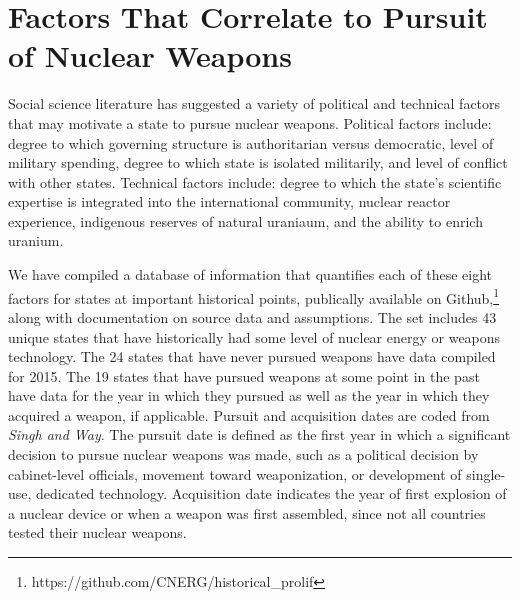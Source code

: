 \section{Factors That Correlate to Pursuit of Nuclear Weapons}
\label{s_factors}

Social science literature has suggested a variety of political and technical factors that may motivate a state to pursue nuclear weapons\cite{bell_questioning_2013, singh_correlates_2004, montgomery_perils_2009, li_model-based_2010, hymans_achieving_2012}. Political factors include: degree to which governing structure is authoritarian versus democratic, level of military spending, degree to which state is isolated militarily, and level of conflict with other states. Technical factors include: degree to which the state's scientific expertise is integrated into the international community, nuclear reactor experience, indigenous reserves of natural uraniaum, and the ability to enrich uranium.

We have compiled a database of information that quantifies each of these eight factors for states at important historical points, publically available on Github,\footnote{https://github.com/CNERG/historical\_prolif} along with documentation on source data and assumptions\cite{hist_prolif}. The set includes 43 unique states that have historically had some level of nuclear energy or weapons technology.  The 24 states that have never pursued weapons have data compiled for 2015. The 19 states that have pursued weapons at some point in the past have data for the year in which they pursued as well as the year in which they acquired a weapon, if applicable. Pursuit and acquisition dates are coded from \emph{Singh and Way}\cite{singh_correlates_2004}. The pursuit date is defined as the first year in which a significant decision to pursue nuclear weapons was made, such as a political decision by cabinet-level officials, movement toward weaponization, or development of single-use, dedicated technology.  Acquisition date indicates the year of first explosion of a nuclear device or when a weapon was first assembled, since not all countries tested their nuclear weapons.


